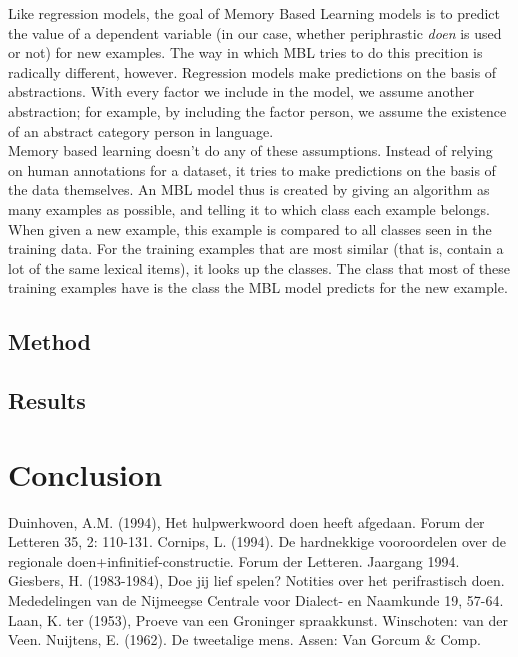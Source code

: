 \documentclass[12pt]{article}
\begin{document}
Like regression models, the goal of Memory Based Learning models is to predict the value of a dependent variable (in our case, whether periphrastic \emph{doen} is used or not) for new examples. The way in which MBL tries to do this precition is radically different, however. Regression models make predictions on the basis of abstractions. With every factor we include in the model, we assume another abstraction; for example, by including the factor person, we assume the existence of an abstract category person in language.\\\indent
Memory based learning doesn't do any of these assumptions. Instead of relying on human annotations for a dataset, it tries to make predictions on the basis of the data themselves. An MBL model thus is created by giving an algorithm as many examples as possible, and telling it to which class each example belongs. When given a new example, this example is compared to all classes seen in the training data. For the training examples that are most similar (that is, contain a lot of the same lexical items), it looks up the classes. The class that most of these training examples have is the class the MBL model predicts for the new example.

\subsection{Method}

\subsection{Results}












\section{Conclusion} \label{conc}


\begin{thebibliography}{99}
Duinhoven, A.M. (1994), Het hulpwerkwoord doen heeft afgedaan. Forum der Letteren 35, 2: 110-131.
Cornips, L. (1994). De hardnekkige vooroordelen over de regionale doen+infinitief-constructie. Forum der Letteren. Jaargang 1994.
Giesbers, H. (1983-1984), Doe jij lief spelen? Notities over het perifrastisch doen. Mededelingen van de Nijmeegse Centrale voor Dialect- en Naamkunde 19, 57-64.
Laan, K. ter (1953), Proeve van een Groninger spraakkunst. Winschoten: van der Veen.
Nuijtens, E. (1962). De tweetalige mens. Assen: Van Gorcum \& Comp.
\end{thebibliography}
\end{document}
